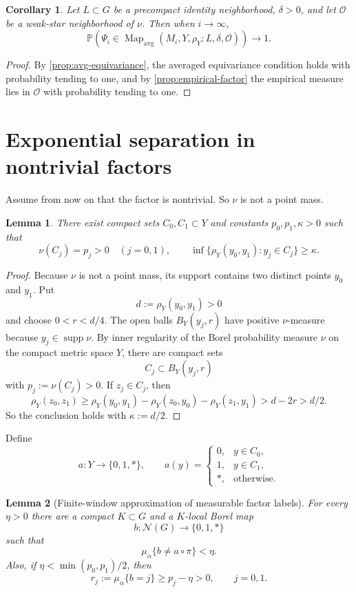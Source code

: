 \documentclass[12pt]{amsart}
\newtheorem{lemma}[lemma]{Lemma}
\newtheorem{corollary}[corollary]{Corollary}
\theoremstyle{definition}
\newcommand{\Mapavg}{\operatorname{Map}_{\mathrm{avg}}}
\newcommand{\cN}{\mathcal N}
\newcommand{\cO}{\mathcal O}
\newcommand{\1}{\mathbf 1}
\begin{document}
\begin{corollary}\label{cor:good-microstates}
Let $L\subset G$ be a precompact identity neighborhood, $\delta>0$, and let $\cO$ be a weak-star neighborhood of $\nu$. Then when $i \to \infty$,
\[
 \mathbb P\left(
 \Psi_i\in\Mapavg(M_i,Y,\rho_Y:L,\delta,\cO)
 \right)\longrightarrow1.
\]
\end{corollary}

\begin{proof}
By \cref{prop:avg-equivariance}, the averaged equivariance condition holds with probability tending to one, and by \cref{prop:empirical-factor} the empirical measure lies in $\cO$ with probability tending to one.
\end{proof}

\section{Exponential separation in nontrivial factors}
Assume from now on that the factor is nontrivial. So $\nu$ is not a point mass.

\begin{lemma}\label{lem:separated-compacts}
There exist compact sets $C_0,C_1\subset Y$ and constants $p_0,p_1,\kappa>0$ such that
\[
 \nu(C_j)=p_j>0\quad(j=0,1),
 \qquad
 \inf\{\rho_Y(y_0,y_1):y_j\in C_j\}\geq\kappa.
\]
\end{lemma}

\begin{proof}
Because $\nu$ is not a point mass, its support contains two distinct points $y_0$ and $y_1$. Put
\[
 d:=\rho_Y(y_0,y_1)>0
\]
and choose $0<r<d/4$. The open balls $B_Y(y_j,r)$ have positive $\nu$-measure because $y_j\in\operatorname{supp}\nu$. By inner regularity of the Borel probability measure $\nu$ on the compact metric space $Y$, there are compact sets
\[
 C_j\subset B_Y(y_j,r)
\]
with $p_j:=\nu(C_j)>0$. If $z_j\in C_j$, then
\[
 \rho_Y(z_0,z_1)
 \geq\rho_Y(y_0,y_1)-\rho_Y(z_0,y_0)-\rho_Y(z_1,y_1)
 >d-2r>d/2.
\]
So the conclusion holds with $\kappa:=d/2$.
\end{proof}

Define
\[
 a:Y\to\{0,1,*\},\qquad
 a(y)=\begin{cases}0,&y\in C_0,\\1,&y\in C_1,\\ *,&\text{otherwise}.
 \end{cases}
\]

\begin{lemma}[Finite-window approximation of measurable factor labels]\label{lem:local-label}
For every $\eta>0$ there are a compact $K\subset G$ and a $K$-local Borel map
\[
 b:\cN(G)\to\{0,1,*\}
\]
such that
\begin{equation}\label{eq:label-error}
 \mu_\alpha\{b\neq a\circ\pi\}<\eta.
\end{equation}
Also, if $\eta<\min(p_0,p_1)/2$, then
\begin{equation}\label{eq:label-masses}
 r_j:=\mu_\alpha\{b=j\}\geq p_j-\eta>0,
 \qquad j=0,1.
\end{equation}
\end{lemma}
\end{document}
